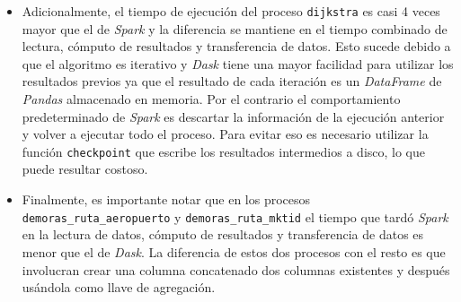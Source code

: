 \begin{itemize}
	\item Adicionalmente, el tiempo de ejecución del proceso \texttt{dijkstra} es casi 4 veces mayor que el de \textit{Spark} y la diferencia se mantiene en el tiempo combinado de lectura, cómputo de resultados y transferencia de datos. Esto sucede debido a que el algoritmo es iterativo y \textit{Dask} tiene una mayor facilidad para utilizar los resultados previos ya que el resultado de cada iteración es un \textit{DataFrame} de \textit{Pandas} almacenado en memoria. Por el contrario el comportamiento predeterminado de \textit{Spark} es descartar la información de la ejecución anterior y volver a ejecutar todo el proceso. Para evitar eso es necesario utilizar la función \texttt{checkpoint} que escribe los resultados intermedios a disco, lo que puede resultar costoso.
	
	\item Finalmente, es importante notar que en los procesos \texttt{demoras\_ruta\_aeropuerto} y \texttt{demoras\_ruta\_mktid} el tiempo que tardó \textit{Spark} en la lectura de datos, cómputo de resultados y transferencia de datos es menor que el de \textit{Dask}. La diferencia de estos dos procesos con el resto es que involucran crear una columna concatenado dos columnas existentes y después usándola como llave de agregación.
\end{itemize}

